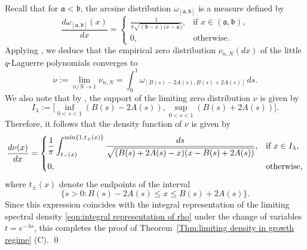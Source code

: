 \documentclass{amsart}
\theoremstyle{plain}
\theoremstyle{remark}
\numberwithin{equation}{section}
\begin{document}
Recall that for $\mathfrak{a}<\mathfrak{b}$, the arcsine distribution $\omega_{[\mathfrak{a},\mathfrak{b}]}$ is a measure defined by 
\begin{equation}
    \frac{d\omega_{[\mathfrak{a},\mathfrak{b}]}(x)}{dx}=
    \begin{cases}
        \displaystyle\frac{1}{\pi\sqrt{(\mathfrak{b}-x)(x-\mathfrak{a}})},&\text{if }x\in(\mathfrak{a},\mathfrak{b}),\\
        0,&\text{otherwise.}
    \end{cases}
\end{equation}
Applying \cite[Theorem~1.4]{KV99}, we deduce that the empirical zero distribution $\nu_{n,N}(dx)$ of the little $q$-Laguerre polynomials converges to
\begin{equation}
\nu:=\lim_{n/N\rightarrow1}\nu_{n,N}=\int_{0}^{1}\omega_{[B(s)-2A(s),B(s)+2A(s)]}\,ds.
\end{equation}
We also note that by \cite[Eq.~(1.10)]{KV99}, the support of the limiting zero distribution $\nu$ is given by
\begin{equation}
    I_\lambda:=\Big[\inf_{0<s<1}(B(s)-2A(s)),\sup_{0<s<1}(B(s)+2A(s))\Big].
\end{equation}
Therefore, it follows that the density function of $\nu$ is given by
\begin{equation}
    \frac{d\nu(x)}{dx}=\begin{cases}
        \displaystyle\frac{1}{\pi}\int_{t_{-}(x)}^{\min\{1,t_{+}(x)\}}\frac{ds}{\sqrt{(B(s)+2A(s)-x)(x-B(s)+2A(s))}} , &\text{if } x\in I_{\lambda},  
        \smallskip 
        \\
        0,&\text{otherwise,}
    \end{cases}
\end{equation}
where $t_{\pm}(x)$ denote the endpoints of the interval
\begin{equation}
    \big\{s>0:B(s)-2A(s)\leq x\leq B(s)+2A(s)\big\}.
\end{equation}
Since this expression coincides with the integral representation of the limiting spectral density \eqref{eqn:integral representation of rho} under the change of variables $t = e^{-\lambda s}$, this completes the proof of Theorem~\ref{Thm:limiting density in growth regime} (C).  \qed 
\end{document}
